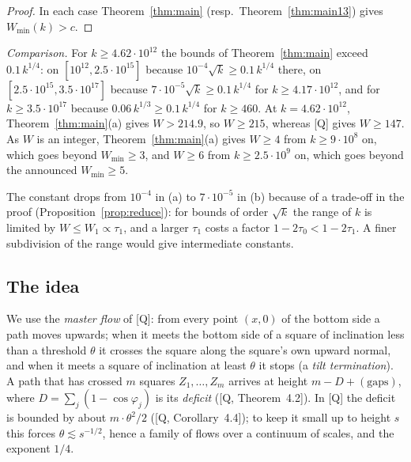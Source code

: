 \documentclass[11pt]{amsart}
\newcommand{\Wmin}{W_{\min}}
\theoremstyle{definition}
\theoremstyle{remark}
\numberwithin{equation}{section}
\begin{document}
\begin{proof}
In each case Theorem~\ref{thm:main} (resp.\ Theorem~\ref{thm:main13}) gives $\Wmin(k)>c$.
\end{proof}

\emph{Comparison.} For $k\ge4.62\cdot10^{12}$ the bounds of Theorem~\ref{thm:main} exceed $0.1\,k^{1/4}$: on
$[10^{12},2.5\cdot10^{15}]$ because $10^{-4}\sqrt k\ge0.1\,k^{1/4}$ there, on $[2.5\cdot10^{15},3.5\cdot10^{17}]$ because
$7\cdot10^{-5}\sqrt k\ge0.1\,k^{1/4}$ for $k\ge4.17\cdot10^{12}$, and for $k\ge3.5\cdot10^{17}$ because
$0.06\,k^{1/3}\ge0.1\,k^{1/4}$ for $k\ge460$. At $k=4.62\cdot10^{12}$, Theorem~\ref{thm:main}(a) gives $W>214.9$, so
$W\ge215$, whereas [Q] gives $W\ge147$. As $W$ is an integer, Theorem~\ref{thm:main}(a) gives $W\ge4$ from
$k\ge9\cdot10^8$ on, which goes beyond $\Wmin\ge3$, and $W\ge6$ from $k\ge2.5\cdot10^9$ on, which goes beyond the
announced $\Wmin\ge5$.

The constant drops from $10^{-4}$ in (a) to $7\cdot10^{-5}$ in (b) because of a trade-off in the proof
(Proposition~\ref{prop:reduce}): for bounds of order $\sqrt k$ the range of $k$ is limited by $W\le W_1\propto\tau_1$,
and a larger $\tau_1$ costs a factor $1-2\tau_0<1-2\tau_1$. A finer subdivision of the range would give intermediate
constants.

\subsection{The idea}\label{ssec:idea}
We use the \emph{master flow} of [Q]: from every point $(x,0)$ of the bottom side a path moves upwards; when it meets
the bottom side of a square of inclination less than a threshold $\theta$ it crosses the square along the square's own
upward normal, and when it meets a square of inclination at least $\theta$ it stops (a \emph{tilt termination}). A path
that has crossed $m$ squares $Z_1,\dots,Z_m$ arrives at height $m-D+(\text{gaps})$, where $D=\sum_j(1-\cos\varphi_j)$
is its \emph{deficit} ([Q, Theorem~4.2]). In [Q] the deficit is bounded by about $m\cdot\theta^2/2$ ([Q,
Corollary~4.4]); to keep it small up to height $s$ this forces $\theta\lesssim s^{-1/2}$, hence a family of flows over a
continuum of scales, and the exponent $1/4$.
\end{document}
